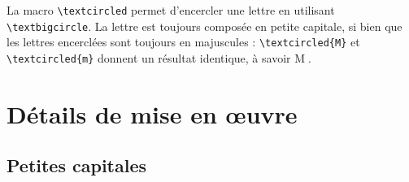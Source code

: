 \documentclass[12pt,english,french]{article}
\begin{document}
La macro \verb+\textcircled+ permet d'encercler une lettre en utilisant \verb+\textbigcircle+. La lettre est toujours composée en petite capitale, si bien que les lettres encerclées sont toujours en majuscules : \verb+\textcircled{M}+ et \verb+\textcircled{m}+ donnent un résultat identique, à savoir \textcircled{M}.

%

\section{Détails de mise en œuvre}

\subsection{Petites capitales}

\end{document}
